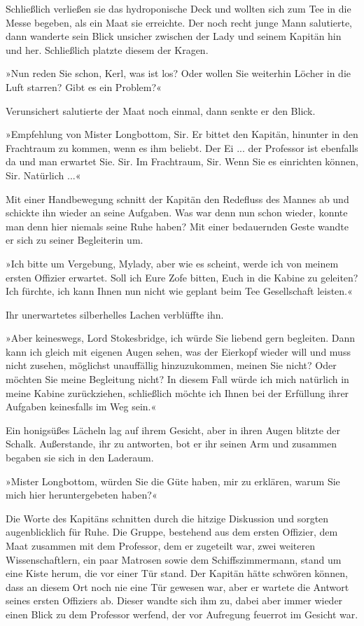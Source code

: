 Schließlich verließen sie das hydroponische Deck und wollten sich
zum Tee in die Messe begeben, als ein Maat sie erreichte. Der noch
recht junge Mann salutierte, dann wanderte sein Blick unsicher
zwischen der Lady und seinem Kapitän hin und her. Schließlich
platzte diesem der Kragen.

»Nun reden Sie schon, Kerl, was ist los? Oder wollen Sie weiterhin
Löcher in die Luft starren? Gibt es ein Problem?«

Verunsichert salutierte der Maat noch einmal, dann senkte er den
Blick.

»Empfehlung von Mister Longbottom, Sir. Er bittet den Kapitän,
hinunter in den Frachtraum zu kommen, wenn es ihm beliebt. Der Ei
... der Professor ist ebenfalls da und man erwartet Sie. Sir. Im
Frachtraum, Sir. Wenn Sie es einrichten können, Sir. Natürlich
...«

Mit einer Handbewegung schnitt der Kapitän den Redefluss des Mannes
ab und schickte ihn wieder an seine Aufgaben. Was war denn nun
schon wieder, konnte man denn hier niemals seine Ruhe haben? Mit
einer bedauernden Geste wandte er sich zu seiner Begleiterin um.

»Ich bitte um Vergebung, Mylady, aber wie es scheint, werde ich von
meinem ersten Offizier erwartet. Soll ich Eure Zofe bitten, Euch in
die Kabine zu geleiten? Ich fürchte, ich kann Ihnen nun nicht wie
geplant beim Tee Gesellschaft leisten.«

Ihr unerwartetes silberhelles Lachen verblüffte ihn.

»Aber keineswegs, Lord Stokesbridge, ich würde Sie liebend gern
begleiten. Dann kann ich gleich mit eigenen Augen sehen, was der
Eierkopf wieder will und muss nicht zusehen, möglichst unauffällig
hinzuzukommen, meinen Sie nicht? Oder möchten Sie meine Begleitung
nicht? In diesem Fall würde ich mich natürlich in meine Kabine
zurückziehen, schließlich möchte ich Ihnen bei der Erfüllung ihrer
Aufgaben keinesfalls im Weg sein.«

Ein honigsüßes Lächeln lag auf ihrem Gesicht, aber in ihren Augen
blitzte der Schalk. Außerstande, ihr zu antworten, bot er ihr
seinen Arm und zusammen begaben sie sich in den Laderaum.

\bigpar

»Mister Longbottom, würden Sie die Güte haben, mir zu erklären,
warum Sie mich hier heruntergebeten haben?«

Die Worte des Kapitäns schnitten durch die hitzige Diskussion und
sorgten augenblicklich für Ruhe. Die Gruppe, bestehend aus dem
ersten Offizier, dem Maat zusammen mit dem Professor, dem er
zugeteilt war, zwei weiteren Wissenschaftlern, ein paar Matrosen
sowie dem Schiffszimmermann, stand um eine Kiste herum, die vor
einer Tür stand. Der Kapitän hätte schwören können, dass an diesem
Ort noch nie eine Tür gewesen war, aber er wartete die Antwort
seines ersten Offiziers ab. Dieser wandte sich ihm zu, dabei aber
immer wieder einen Blick zu dem Professor werfend, der vor
Aufregung feuerrot im Gesicht war.


